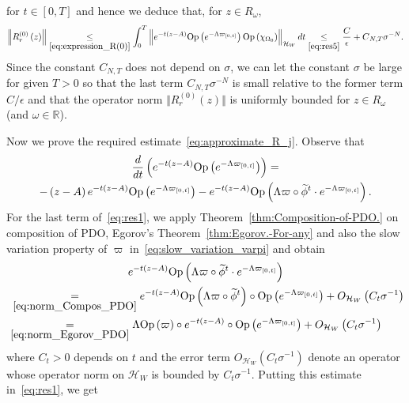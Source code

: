\documentclass[10pt]{amsart}
\theoremstyle{definition}\newtheorem{defi}[theo]{Definition}\newtheorem{rema}[theo]{Remark}\newtheorem{exam}[theo]{Example}\newtheorem{exem}[theo]{Example}\newtheorem{nota}[theo]{Notation}
\newcommand{\clH}{\mathcal{H}}
\newcommand{\Opp}{\mathrm{Op}}
\newcommand{\bbR}{\mathbb{R}}
\let\oldtilde\tilde
\renewcommand*{\tilde}[1]{\mathchoice{\widetilde{#1}}{\widetilde{#1}}{\oldtilde{#1}}{\oldtilde{#1}}}
\begin{document}
for $t\in[0,T]$ and hence we deduce that, for $z\in R_{\omega}$,
\[
\left\Vert R_{r}^{\left(0\right)}\left(z\right)\right\Vert \underset{\eqref{eq:expression_R(0)}}{\leq}\int_{0}^{T}\left\Vert e^{-t\left(z-A\right)}\Opp \left(e^{-\Lambda\varpi_{\left[0,t\right]}}\right)\Opp \left(\chi_{\Omega_{0}}\right)\right\Vert _{\clH _{W}}dt\underset{\eqref{eq:res5}}{\leq}\frac{C}{\epsilon}+C{}_{N,T}\sigma{}^{-N}.
\]
Since the constant $C_{N,T}$ does not depend on $\sigma$, we can let the constant $\sigma$ be large for given $T>0$ so that the last term $C_{N,T}\sigma{}^{-N}$ is small relative to the former term $C/\epsilon$ and that the operator norm $\Vert R_{r}^{(0)}(z)\Vert $ is uniformly bounded for $z\in R_{\omega}$ (and $\omega\in\bbR$).

Now we prove the required estimate~\eqref{eq:approximate_R_j}. Observe that
\begin{multline}\label{eq:res1}
\frac{d}{dt}\left(e^{-t\left(z-A\right)}\Opp \left(e^{-\Lambda\varpi_{\left[0,t\right]}}\right)\right)  =\\
-\left(z-A\right)e^{-t\left(z-A\right)}\Opp \left(e^{-\Lambda\varpi_{\left[0,t\right]}}\right)
-e^{-t\left(z-A\right)}\Opp \left(\Lambda\varpi\circ\tilde{\phi}^{t}\cdot e^{-\Lambda\varpi_{\left[0,t\right]}}\right).
\end{multline}
For the last term of~\eqref{eq:res1}, we apply Theorem~\ref{thm:Composition-of-PDO.} on composition of PDO, Egorov's Theorem~\ref{thm:Egorov.-For-any} and also the slow variation property of $\varpi$ in~\eqref{eq:slow_variation_varpi} and obtain
\begin{multline*}
e^{-t\left(z-A\right)} \Opp \left(\Lambda\varpi\circ\tilde{\phi}^{t}\cdot e^{-\Lambda\varpi_{\left[0,t\right]}}\right)\\
\begin{aligned}
&\:\underset{\eqref{eq:norm_Compos_PDO}}{=}  e^{-t\left(z-A\right)}\Opp \left(\Lambda\varpi\circ\tilde{\phi}^{t}\right)\circ\Opp \left(e^{-\Lambda\varpi_{\left[0,t\right]}}\right)+O_{\clH _{W}}\left(C_{t}\sigma^{-1}\right)\\
&\underset{\eqref{eq:norm_Egorov_PDO}}{=}  \Lambda\Opp \left(\varpi\right)\circ e^{-t\left(z-A\right)}\circ\Opp \left(e^{-\Lambda\varpi_{\left[0,t\right]}}\right)+O_{\clH _{W}}\left(C_{t}\sigma^{-1}\right)
\end{aligned}
\end{multline*}
where $C_{t}>0$ depends on $t$ and the error term $O_{\clH _{W}}(C_{t}\sigma^{-1})$ denote an operator whose operator norm on $\clH _{W}$ is bounded by $C_{t}\sigma^{-1}$. Putting this estimate in~\eqref{eq:res1}, we get
\end{document}
